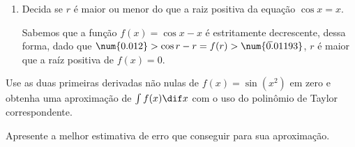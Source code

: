 \documentclass{IMTexam}
\newcommand{\decSep}{,}
\newcommand{\decNum}[3]{\rlap{\ensuremath{\phantom{#1\mathord{\decSep}#2}\overline{\phantom{#3}}}}\num{#1.#2#3}}
\begin{document}
\begin{questions}
\begin{enumerate}[label=(\roman*)]
\begin{solution}
                \hfill\qedsymbol
            \end{solution}
            \item Decida se $ r $ é maior ou menor do que a raiz
            positiva da equação $ \cos x = x $.

            \begin{solution}
                Sabemos que a função $f(x)=\cos x - x$ é estritamente
                decrescente, dessa forma, dado que $\num{0.012}>\cos
                r-r=f(r)>\decNum{0}{0119}{3}$,
                $r$ é maior que a raíz positiva de $f(x)=0$.
            \end{solution}
        \end{enumerate}

        \question Use as duas primeiras derivadas não nulas de
        $ f(x) = \sin(x^2) $ em zero e obtenha uma
        aproximação de $ \int f (x) \dif x$ com o uso do polinômio de
        Taylor correspondente.

        Apresente a melhor estimativa de erro que conseguir para sua
        aproximação.


\end{questions}
\end{document}
